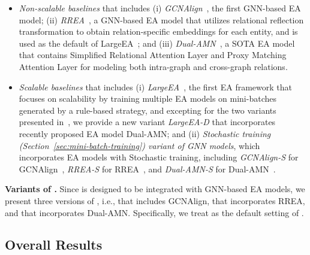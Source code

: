 {%
\begin{itemize}[topsep=0pt,itemsep=0pt,parsep=0pt,partopsep=0pt,leftmargin=*]
    \item \emph{Non-scalable baselines} that includes
            (i) \emph{GCNAlign}~\cite{GCN-Align18}, the first GNN-based EA model;
            (ii) \emph{RREA}~\cite{RREA20}, a GNN-based EA model that utilizes relational reflection transformation to obtain relation-specific embeddings for each entity, and is used as the default of LargeEA~\cite{LargeEA22}; and
            (iii) \emph{Dual-AMN}~\cite{DualAMN21}, a SOTA EA model that contains Simplified Relational Attention Layer and Proxy Matching Attention Layer for modeling both intra-graph and cross-graph relations.
    \item \emph{Scalable baselines} that includes
            (i) \emph{LargeEA}~\cite{LargeEA22}, the first EA framework that focuses on scalability by training multiple EA models on mini-batches generated by a rule-based strategy, and excepting for the two variants presented in~\cite{LargeEA22},
            we provide a new variant \emph{LargeEA-D} that incorporates recently proposed EA model Dual-AMN; and
            (ii) \emph{Stochastic training (Section~\ref{sec:mini-batch-training}) variant of GNN models}, which incorporates EA models with Stochastic training, including \emph{GCNAlign-S} for GCNAlign~\cite{GCN-Align18}, \emph{RREA-S} for RREA~\cite{RREA20}, and \emph{Dual-AMN-S} for Dual-AMN~\cite{DualAMN21}.
\end{itemize}
}


\noindent
\textbf{Variants of \ClusterEA{}.}
Since \ClusterEA{} is designed to be integrated with GNN-based EA models, we present three versions of \ClusterEA{}, i.e.,   that includes GCNAlign,  that incorporates RREA, and   that incorporates Dual-AMN. Specifically, we treat  as the default setting of \ClusterEA{}.

\subsection{Overall Results}


